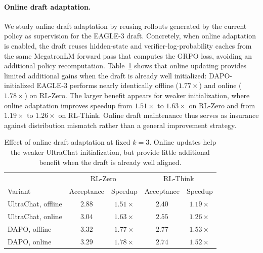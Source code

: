 \documentclass[11pt, logo, onecolumn, copyright, colorlinks=true, allcolors=blue]{nvidiatechreport}
\begin{document}
\paragraph{Online draft adaptation.}
We study online draft adaptation by reusing rollouts generated by the current policy as supervision for the EAGLE-3 draft. Concretely, when online adaptation is enabled, the draft reuses hidden-state and verifier-log-probability caches from the same MegatronLM forward pass that computes the GRPO loss, avoiding an additional policy recomputation. Table~\ref{tab:online_ablation} shows that online updating provides limited additional gains when the draft is already well initialized: DAPO-initialized EAGLE-3 performs nearly identically offline ($1.77\times$) and online ($1.78\times$) on RL-Zero. The larger benefit appears for weaker initialization, where online adaptation improves speedup from $1.51\times$ to $1.63\times$ on RL-Zero and from $1.19\times$ to $1.26\times$ on RL-Think. Online draft maintenance thus serves as insurance against distribution mismatch rather than a general improvement strategy.

\begin{table}[ht]
\centering
\small
\begin{tabular}{l cccc}
\toprule
\multicolumn{1}{c}{} & \multicolumn{2}{c}{RL-Zero} & \multicolumn{2}{c}{RL-Think} \\
Variant & Acceptance & Speedup & Acceptance & Speedup \\
\midrule
UltraChat, offline & $2.88$ & $1.51\times$ & $2.40$ & $1.19\times$ \\
UltraChat, online  & $3.04$ & $1.63\times$ & $2.55$ & $1.26\times$ \\
DAPO, offline      & $3.32$ & $1.77\times$ & $2.77$ & $1.53\times$ \\
DAPO, online       & $3.29$ & $1.78\times$ & $2.74$ & $1.52\times$ \\
\bottomrule
\end{tabular}
\caption{Effect of online draft adaptation at fixed $k=3$. Online updates help the weaker UltraChat initialization, but provide little additional benefit when the draft is already well aligned.}
\label{tab:online_ablation}
\end{table}
\end{document}
